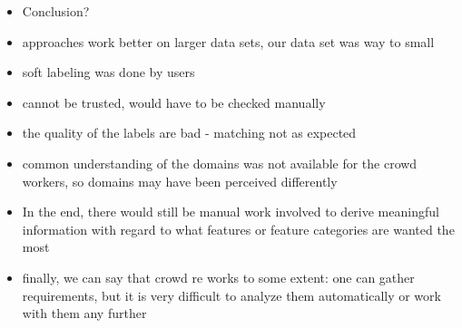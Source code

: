 \begin{itemize}
\item Conclusion?
\item approaches work better on larger data sets, our data set was way to small
\item soft labeling was done by users
\item cannot be trusted, would have to be checked manually
\item the quality of the labels are bad - matching not as expected
\item common understanding of the domains was not available for the crowd workers, so domains may have been perceived differently
\item In the end, there would still be manual work involved to derive meaningful information with regard to what features or feature categories are wanted the most
\item finally, we can say that crowd re works to some extent: one can gather requirements, but it is very difficult to analyze them automatically or work with them any further 
\end{itemize}

